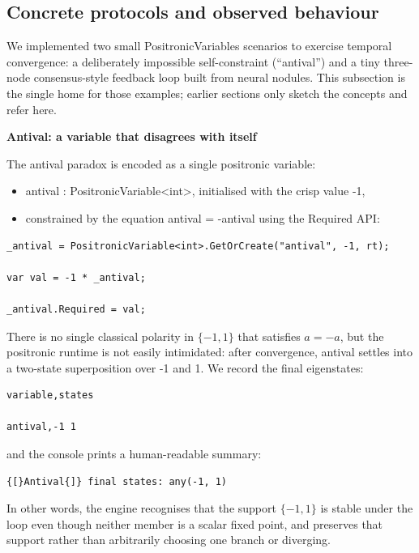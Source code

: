 \documentclass[a4paper,11pt]{article}
\begin{document}
\subsection{Concrete protocols and observed behaviour}

We implemented two small PositronicVariables scenarios to exercise temporal convergence: a deliberately impossible self-constraint (``antival'') and a tiny three-node consensus-style feedback loop built from neural nodules. This subsection is the single home for those examples; earlier sections only sketch the concepts and refer here.

\textbf{Antival: a variable that disagrees with itself}

The antival paradox is encoded as a single positronic variable:

\begin{itemize}
\item
  antival : PositronicVariable\textless int\textgreater, initialised with the crisp value -1,
\item
  constrained by the equation antival = -antival using the Required API:
\end{itemize}

\begin{lstlisting}[style=codeblock]
_antival = PositronicVariable<int>.GetOrCreate("antival", -1, rt);

var val = -1 * _antival;

_antival.Required = val;
\end{lstlisting}

There is no single classical polarity in \(\{-1,1\}\) that satisfies \(a=-a\), but the
positronic runtime is not easily intimidated: after convergence, antival settles
into a two-state superposition over -1 and 1. We record the final eigenstates:

\begin{lstlisting}[style=datadumpnofloat]
variable,states

antival,-1 1
\end{lstlisting}

and the console prints a human-readable summary:

\begin{lstlisting}[style=datadumpnofloat]
{[}Antival{]} final states: any(-1, 1)
\end{lstlisting}

In other words, the engine recognises that the support \(\{-1,1\}\) is stable
under the loop even though neither member is a scalar fixed point, and preserves
that support rather than arbitrarily choosing one branch or diverging.
\end{document}
